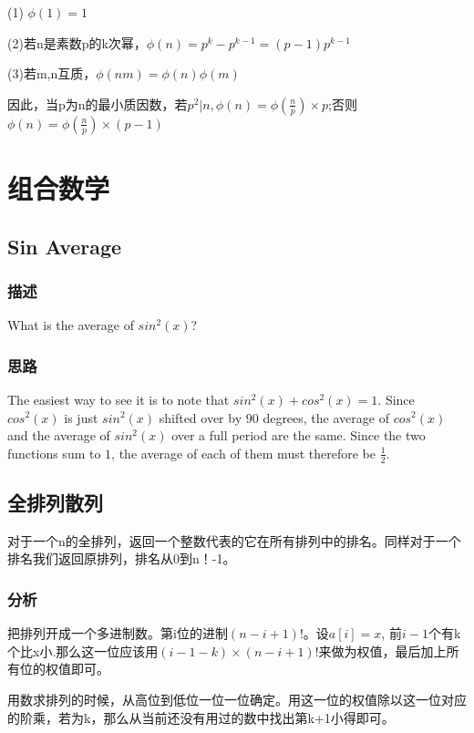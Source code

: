 (1) $\phi(1)=1$

(2)若n是素数p的k次幂，$\phi(n)=p^k-p^{k-1}=(p-1)p^{k-1}$

(3)若m,n互质，$\phi(nm)=\phi(n)\phi(m)$

因此，当p为n的最小质因数，若$p^2|n,\phi(n)=\phi(\frac{n}{p})\times p$;否则$\phi(n)=\phi(\frac{n}{p})\times (p-1)$

\section{组合数学} %

\subsection{Sin Average}
\subsubsection{描述}
What is the average of $sin^2(x)$?
\subsubsection{思路}
The easiest way to see it is to note that $sin^2(x)+cos^2(x)=1$. Since $cos^2(x)$ is just $sin^2(x)$ shifted over by $90$ degrees, the average of $cos^2(x)$ and the average of 
$sin^2(x)$ over a full period are the same. Since the two functions sum to $1$, the average of each of them must therefore be $\frac{1}{2}$.

\subsection{全排列散列}
对于一个n的全排列，返回一个整数代表的它在所有排列中的排名。同样对于一个排名我们返回原排列，排名从0到n！-1。

\subsubsection{分析}
把排列开成一个多进制数。第i位的进制$(n-i+1)!$。设$a[i]=x$, 前$i-1$个有k个比x小.那么这一位应该用$(i-1-k)\times(n-i+1)!$来做为权值，最后加上所有位的权值即可。

用数求排列的时候，从高位到低位一位一位确定。用这一位的权值除以这一位对应的阶乘，若为k，那么从当前还没有用过的数中找出第k+1小得即可。